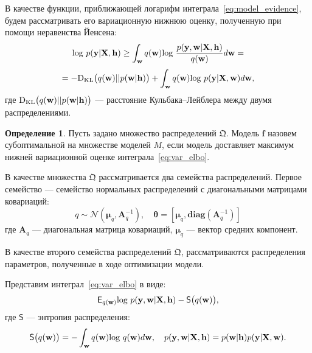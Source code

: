 \documentclass[11pt, a5paper]{dissert}
\theoremstyle{definition}
\newtheorem{defin}{Определение}
\begin{document}


{В качестве функции, приближающей логарифм интеграла~\eqref{eq:model_evidence}, будем рассматривать его вариационную нижнюю оценку, полученную при помощи неравенства Йенсена:
\begin{equation} 
\label{eq:var_elbo}
\textnormal{log}~p(\mathbf{y}|\mathbf{X},\mathbf{h})   \geq	\int_{\mathbf{w}} q(\mathbf{w})\textnormal{log}~\frac{p(\mathbf{y},\mathbf{w}|\mathbf{X},\mathbf{h})}{q(\mathbf{w})}d\mathbf{w} =
\end{equation} 
$$
= -\textnormal{D}_\textnormal{KL} \bigl(q(\mathbf{w})||p(\mathbf{w}|\mathbf{h})\bigr) + \int_{\mathbf{w}} q(\mathbf{w})\textnormal{log}~{p(\mathbf{y}|\mathbf{X},\mathbf{w})} d \mathbf{w},
$$
где $\textnormal{D}_\textnormal{KL}\bigl(q(\mathbf{w})||p(\mathbf{w} |\mathbf{h})\bigr)$ --- расстояние Кульбака--Лейблера между двумя распределениями.


\begin{defin} Пусть задано множество распределений $\mathfrak{Q}$. Модель $\mathbf{f}$ назовем субоптимальной на множестве моделей $M$, если модель доставляет максимум нижней вариационной оценке интеграла~\eqref{eq:var_elbo}.
\end{defin}

В качестве множества $\mathfrak{Q}$ рассматривается два семейства распределений.
Первое семейство --- семейство нормальных распределений с диагональными матрицами ковариаций:
\begin{equation}
\label{eq:diag}
	q \sim \mathcal{N}(\boldsymbol{\mu}_q, \mathbf{A}^{-1}_q),\quad\boldsymbol{\theta}=[\boldsymbol{\mu}_q, \textbf{diag}(\mathbf{A}^{-1}_q)]
\end{equation}
где $\mathbf{A}_q$ --- диагональная матрица ковариаций, $\boldsymbol{\mu}_q$ --- вектор средних компонент.

В качестве второго семейства распределений $\mathfrak{Q}$, рассматриваются распределения параметров, полученные в ходе оптимизации модели.

Представим интеграл~\eqref{eq:var_elbo} в виде:
\begin{equation}
\label{eq:var_elbo_entropy}
 \mathsf{E}_{q(\mathbf{w)}} \textnormal{log~}p (\mathbf{y}, \mathbf{w}|\mathbf{X}, \mathbf{h}) - \mathsf{S}\bigl({q(\mathbf{w)}}\bigr),
\end{equation}
где $\mathsf{S}$ --- энтропия распределения:
\[
\mathsf{S}\bigl({q(\mathbf{w)}}\bigr) = - \int_{\mathbf{w}} q(\mathbf{w})\textnormal{log}~q(\mathbf{w})d\mathbf{w}, \quad 
p (\mathbf{y}, \mathbf{w}|\mathbf{X}, \mathbf{h}) = p (\mathbf{w}| \mathbf{h}) p (\mathbf{y}|\mathbf{X}, \mathbf{w}).
\]


}
\end{document}

